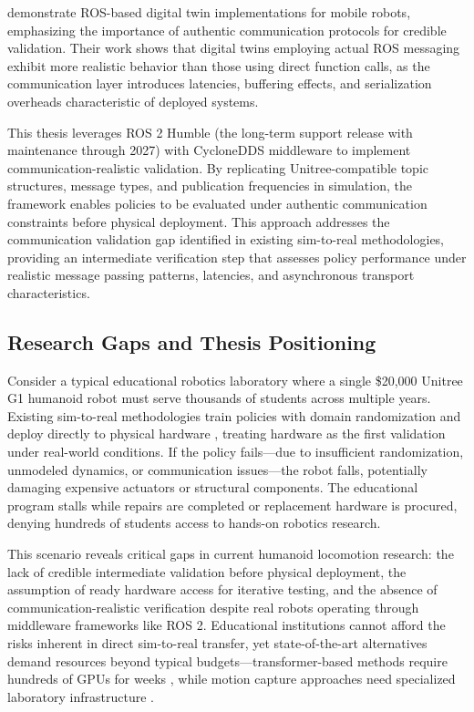 \documentclass[12pt,a4paper]{article}
\begin{document}
\textcite{digitaltwinros2023development} demonstrate ROS-based digital twin implementations for mobile robots, emphasizing the importance of authentic communication protocols for credible validation. Their work shows that digital twins employing actual ROS messaging exhibit more realistic behavior than those using direct function calls, as the communication layer introduces latencies, buffering effects, and serialization overheads characteristic of deployed systems.

This thesis leverages ROS 2 Humble (the long-term support release with maintenance through 2027) with CycloneDDS middleware to implement communication-realistic validation. By replicating Unitree-compatible topic structures, message types, and publication frequencies in simulation, the framework enables policies to be evaluated under authentic communication constraints before physical deployment. This approach addresses the communication validation gap identified in existing sim-to-real methodologies, providing an intermediate verification step that assesses policy performance under realistic message passing patterns, latencies, and asynchronous transport characteristics.

\subsection{Research Gaps and Thesis Positioning}

Consider a typical educational robotics laboratory where a single \$20,000 Unitree G1 humanoid robot must serve thousands of students across multiple years. Existing sim-to-real methodologies train policies with domain randomization and deploy directly to physical hardware \parencite{gu2024humanoidgym}, treating hardware as the first validation under real-world conditions. If the policy fails—due to insufficient randomization, unmodeled dynamics, or communication issues—the robot falls, potentially damaging expensive actuators or structural components. The educational program stalls while repairs are completed or replacement hardware is procured, denying hundreds of students access to hands-on robotics research.

This scenario reveals critical gaps in current humanoid locomotion research: the lack of credible intermediate validation before physical deployment, the assumption of ready hardware access for iterative testing, and the absence of communication-realistic verification despite real robots operating through middleware frameworks like ROS 2. Educational institutions cannot afford the risks inherent in direct sim-to-real transfer, yet state-of-the-art alternatives demand resources beyond typical budgets—transformer-based methods require hundreds of GPUs for weeks \parencite{radosavovic2024realworld}, while motion capture approaches need specialized laboratory infrastructure \parencite{cheng2024expressive}.
\end{document}
